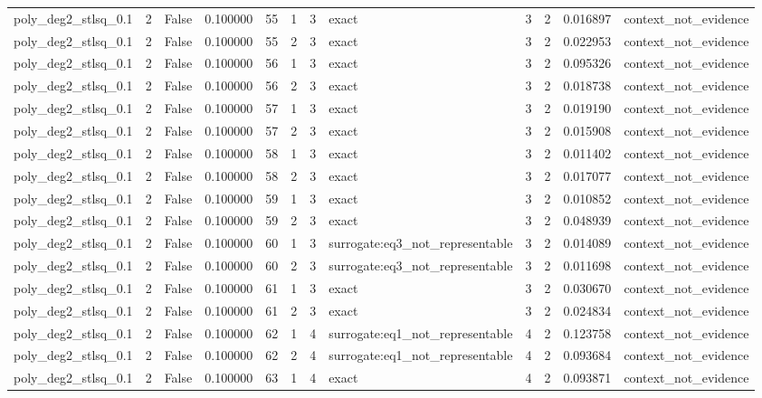 \begin{tabular}{lrrrrrrlrrrl}
poly\_deg2\_stlsq\_0.1 & 2 & False & 0.100000 & 55 & 1 & 3 & exact & 3 & 2 & 0.016897 & context\_not\_evidence \\
poly\_deg2\_stlsq\_0.1 & 2 & False & 0.100000 & 55 & 2 & 3 & exact & 3 & 2 & 0.022953 & context\_not\_evidence \\
poly\_deg2\_stlsq\_0.1 & 2 & False & 0.100000 & 56 & 1 & 3 & exact & 3 & 2 & 0.095326 & context\_not\_evidence \\
poly\_deg2\_stlsq\_0.1 & 2 & False & 0.100000 & 56 & 2 & 3 & exact & 3 & 2 & 0.018738 & context\_not\_evidence \\
poly\_deg2\_stlsq\_0.1 & 2 & False & 0.100000 & 57 & 1 & 3 & exact & 3 & 2 & 0.019190 & context\_not\_evidence \\
poly\_deg2\_stlsq\_0.1 & 2 & False & 0.100000 & 57 & 2 & 3 & exact & 3 & 2 & 0.015908 & context\_not\_evidence \\
poly\_deg2\_stlsq\_0.1 & 2 & False & 0.100000 & 58 & 1 & 3 & exact & 3 & 2 & 0.011402 & context\_not\_evidence \\
poly\_deg2\_stlsq\_0.1 & 2 & False & 0.100000 & 58 & 2 & 3 & exact & 3 & 2 & 0.017077 & context\_not\_evidence \\
poly\_deg2\_stlsq\_0.1 & 2 & False & 0.100000 & 59 & 1 & 3 & exact & 3 & 2 & 0.010852 & context\_not\_evidence \\
poly\_deg2\_stlsq\_0.1 & 2 & False & 0.100000 & 59 & 2 & 3 & exact & 3 & 2 & 0.048939 & context\_not\_evidence \\
poly\_deg2\_stlsq\_0.1 & 2 & False & 0.100000 & 60 & 1 & 3 & surrogate:eq3\_not\_representable & 3 & 2 & 0.014089 & context\_not\_evidence \\
poly\_deg2\_stlsq\_0.1 & 2 & False & 0.100000 & 60 & 2 & 3 & surrogate:eq3\_not\_representable & 3 & 2 & 0.011698 & context\_not\_evidence \\
poly\_deg2\_stlsq\_0.1 & 2 & False & 0.100000 & 61 & 1 & 3 & exact & 3 & 2 & 0.030670 & context\_not\_evidence \\
poly\_deg2\_stlsq\_0.1 & 2 & False & 0.100000 & 61 & 2 & 3 & exact & 3 & 2 & 0.024834 & context\_not\_evidence \\
poly\_deg2\_stlsq\_0.1 & 2 & False & 0.100000 & 62 & 1 & 4 & surrogate:eq1\_not\_representable & 4 & 2 & 0.123758 & context\_not\_evidence \\
poly\_deg2\_stlsq\_0.1 & 2 & False & 0.100000 & 62 & 2 & 4 & surrogate:eq1\_not\_representable & 4 & 2 & 0.093684 & context\_not\_evidence \\
poly\_deg2\_stlsq\_0.1 & 2 & False & 0.100000 & 63 & 1 & 4 & exact & 4 & 2 & 0.093871 & context\_not\_evidence \\

\end{tabular}
